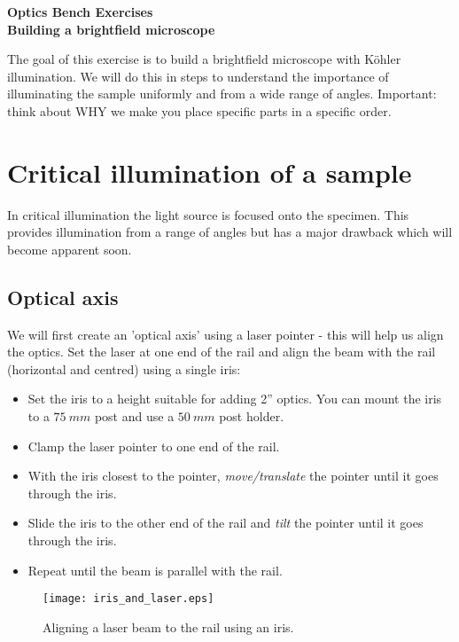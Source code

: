 \documentclass[a4paper]{report}
\begin{document}
\setcounter{secnumdepth}{2}

\begin{center}
\textbf{\Large{Optics Bench Exercises \\ \vspace{5mm} Building a brightfield microscope}}
\end{center}

\vspace{10mm}

The goal of this exercise is to build a brightfield microscope with K\"{o}hler illumination. We will do this in steps to understand the importance of illuminating the sample uniformly and from a wide range of angles. Important: think about WHY we make you place specific parts in a specific order.


\section{Critical illumination of a sample}
In critical illumination the light source is focused onto the specimen.
This provides illumination from a range of angles but has a major drawback which will become apparent soon. 

\subsection{Optical axis}
We will first create an 'optical axis' using a laser pointer - this will help us align the optics. Set the laser at one end of the rail and align the beam with the rail (horizontal and centred) using a single iris:
\begin{itemize}
    \setlength\itemsep{0.1em}
    \item Set the iris to a height suitable for adding 2'' optics. You can mount the iris to a $75~mm$ post and use a $50~mm$ post holder. 
    \item Clamp the laser pointer to one end of the rail.
    \item With the iris closest to the pointer, \textit{move/translate} the pointer until it goes through the iris. 
    \item Slide the iris to the other end of the rail and \textit{tilt} the pointer until it goes through the iris. 
    \item Repeat until the beam is parallel with the rail. 
\end{itemize} 

\begin{figure}[h]
\center
\texttt{[image: iris\_and\_laser.eps]}
\caption{Aligning a laser beam to the rail using an iris.}
\label{fig:beam_iris}
\end{figure}
\end{document}
